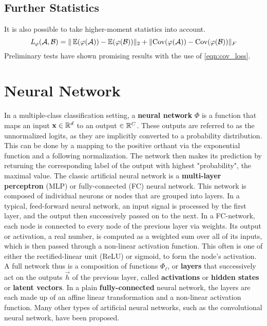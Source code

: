 \subsection{Further Statistics}

It is also possible to take higher-moment statistics into account. 
%
\begin{equation*}
    \textit{L} _{\varphi} (\mathcal A, \mathcal B) = 
    \|\operatorname{\mathbb{E}} ({\varphi (\mathcal A)}) - \operatorname{\mathbb{E}} ({\varphi (\mathcal B)})\|_2 +
    \|\text{Cov} ({\varphi (\mathcal A)}) - \text{Cov} ({\varphi (\mathcal B)})\|_F
    \label{eqn:cov_loss}
\end{equation*}
%
Preliminary tests have shown promising results with the use of \cref{eqn:cov_loss}.



\section{Neural Network}
\label{sec:nn_def}

In a multiple-class classification setting, a \textbf{neural network} $\Phi$ is a function that maps an input $\mathbf x \in \mathbb{R}^d$ to an output $\in \mathbb{R}^C$.
These outputs are referred to as the unnormalized logits, as they are 
implicitly converted to a probability distribution.
This can be done by a mapping to the positive orthant via the exponential function and
a following normalization.
The network then makes its prediction by returning the corresponding label
of the output with highest "probability", the maximal value.
The classic artificial neural network is a \textbf{multi-layer perceptron} (MLP) or fully-connected (FC) neural network.
This network is composed of individual neurons or nodes 
that are grouped into layers.
In a typical, feed-forward neural network, an input signal is processed by the first
layer, and the output then successively passed on to the next.
In a FC-network, each node is connected to every node of the previous layer via weights.
Its output or activation, a real number, is computed as a weighted sum over all of 
its inputs, which is then passed through a non-linear activation function.
This often is one of either the rectified-linear unit (ReLU) or sigmoid, to form the node's activation. 
A full network thus is a composition of functions $\Phi_\ell$, or \textbf{layers} that 
successively act on the outputs $\vec h$ of the previous layer, called \textbf{activations} or \textbf{hidden states} or \textbf{latent vectors}. 
In a plain \textbf{fully-connected} neural network, the layers are each made up of an affine linear transformation and a non-linear activation function.
Many other types of artificial neural networks, such as the convolutional neural network, 
have been proposed.

